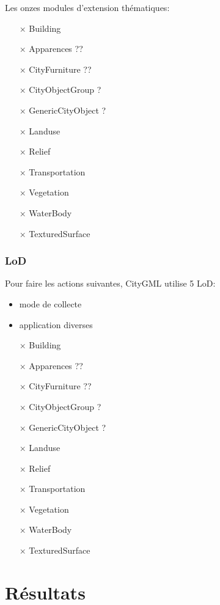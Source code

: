 \documentclass[11pt]{report}
\begin{document}
Les onzes modules d'extension thématiques:
\begin{itemize}
\item [$\times$] Building
\item [$\times$] Apparences ??
\item [$\times$] CityFurniture ??
\item [$\times$] CityObjectGroup ?
\item [$\times$] GenericCityObject ?
\item [$\times$] Landuse
\item [$\times$] Relief
\item [$\times$] Transportation
\item [$\times$] Vegetation
\item [$\times$] WaterBody
\item [$\times$] TexturedSurface
\end{itemize}

\subsubsection{LoD}

Pour faire les actions suivantes, CityGML utilise 5 LoD:
\begin{itemize}
	\item mode de collecte
	\item application diverses
\end{itemize}

\begin{itemize}
\item [$\times$] Building
\item [$\times$] Apparences ??
\item [$\times$] CityFurniture ??
\item [$\times$] CityObjectGroup ?
\item [$\times$] GenericCityObject ?
\item [$\times$] Landuse
\item [$\times$] Relief
\item [$\times$] Transportation
\item [$\times$] Vegetation
\item [$\times$] WaterBody
\item [$\times$] TexturedSurface
\end{itemize}

\section{Résultats}
\end{document}
